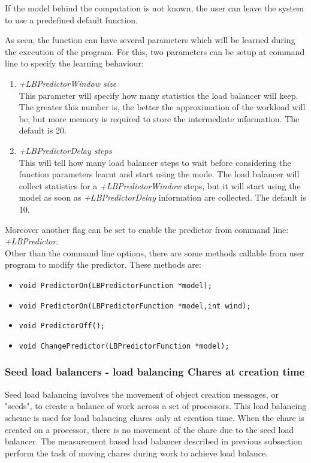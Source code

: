 If the model behind the computation is not known, the user can leave the system to
use a predefined default function.

As seen, the function can have several parameters which will be learned during
the execution of the program. For this, two parameters can be setup at command
line to specify the learning behaviour:
\begin{enumerate}
\item {\em +LBPredictorWindow size}\\
This parameter will specify how many statistics the load balancer will keep. 
The greater this number is, the better the
approximation of the workload will be, but more memory is required to store
the intermediate information. The default is 20.
\item {\em +LBPredictorDelay steps}\\
This will tell how many load balancer steps to wait before considering the
function parameters learnt and start using the mode. The load balancer will
collect statistics for a {\em +LBPredictorWindow} steps, but it will start using
the model as soon as {\em +LBPredictorDelay} information are collected. The
default is 10.
\end{enumerate}
Moreover another flag can be set to enable the predictor from command line: {\em
+LBPredictor}.\\
Other than the command line options, there are some methods
callable from user program to modify the predictor. These methods are:
\begin{itemize}
\item {\tt void PredictorOn(LBPredictorFunction *model);}
\item {\tt void PredictorOn(LBPredictorFunction *model,int wind);}
\item {\tt void PredictorOff();}
\item {\tt void ChangePredictor(LBPredictorFunction *model);}
\end{itemize}


\subsubsection{Seed load balancers - load balancing Chares at creation time}

\label{seedlb}

Seed load balancing involves the movement of object creation messages, or
"seeds", to create a balance of work across a set of processors. This load
balancing scheme is used for load balancing chares only at creation time. When
the chare is created on a processor, there is no movement of the chare due to
the seed load balancer. The measurement based load balancer described in
previous subsection perform the task of moving chares during work to achieve
load balance.


